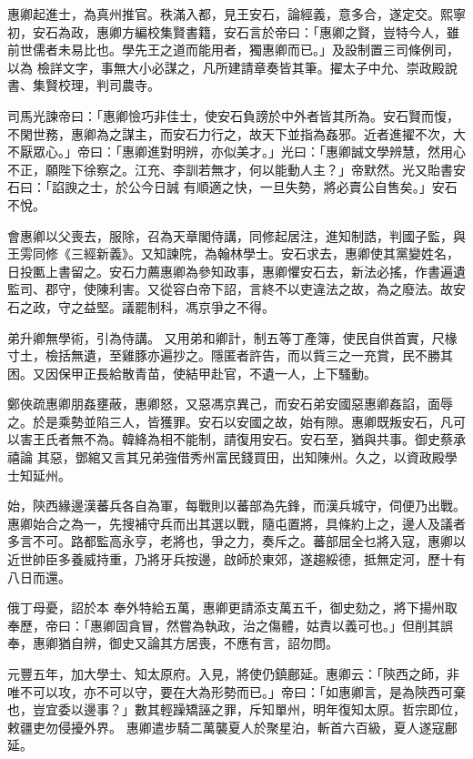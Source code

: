 \begin{pinyinscope}
 惠卿起進士，為真州推官。秩滿入都，見王安石，論經義，意多合，遂定交。熙寧初，安石為政，惠卿方編校集賢書籍，安石言於帝曰：「惠卿之賢，豈特今人，雖前世儒者未易比也。學先王之道而能用者，獨惠卿而已。」及設制置三司條例司，以為
 檢詳文字，事無大小必謀之，凡所建請章奏皆其筆。擢太子中允、崇政殿說書、集賢校理，判司農寺。



 司馬光諫帝曰：「惠卿憸巧非佳士，使安石負謗於中外者皆其所為。安石賢而愎，不閑世務，惠卿為之謀主，而安石力行之，故天下並指為姦邪。近者進擢不次，大不厭眾心。」帝曰：「惠卿進對明辨，亦似美才。」光曰：「惠卿誠文學辨慧，然用心不正，願陛下徐察之。江充、李訓若無才，何以能動人主？」帝默然。光又貽書安石曰：「諂諛之士，於公今日誠
 有順適之快，一旦失勢，將必賣公自售矣。」安石不悅。



 會惠卿以父喪去，服除，召為天章閣侍講，同修起居注，進知制誥，判國子監，與王雱同修《三經新義》。又知諫院，為翰林學士。安石求去，惠卿使其黨變姓名，日投匭上書留之。安石力薦惠卿為參知政事，惠卿懼安石去，新法必搖，作書遍遺監司、郡守，使陳利害。又從容白帝下詔，言終不以吏違法之故，為之廢法。故安石之政，守之益堅。議罷制科，馮京爭之不得。



 弟升卿無學術，引為侍講。
 又用弟和卿計，制五等丁產簿，使民自供首實，尺椽寸土，檢括無遺，至雞豚亦遍抄之。隱匿者許告，而以貲三之一充賞，民不勝其困。又因保甲正長給散青苗，使結甲赴官，不遺一人，上下騷動。



 鄭俠疏惠卿朋姦壅蔽，惠卿怒，又惡馮京異己，而安石弟安國惡惠卿姦諂，面辱之。於是乘勢並陷三人，皆獲罪。安石以安國之故，始有隙。惠卿既叛安石，凡可以害王氏者無不為。韓絳為相不能制，請復用安石。安石至，猶與共事。御史蔡承禧論
 其惡，鄧綰又言其兄弟強借秀州富民錢買田，出知陳州。久之，以資政殿學士知延州。



 始，陝西緣邊漢蕃兵各自為軍，每戰則以蕃部為先鋒，而漢兵城守，伺便乃出戰。惠卿始合之為一，先搜補守兵而出其選以戰，隨屯置將，具條約上之，邊人及議者多言不可。路都監高永亨，老將也，爭之力，奏斥之。蕃部屈全乜將入寇，惠卿以近世帥臣多養威持重，乃將牙兵按邊，啟師於東郊，遂趨綏德，抵無定河，歷十有八日而還。



 俄丁母憂，詔於本
 奉外特給五萬，惠卿更請添支萬五千，御史劾之，將下揚州取奉歷，帝曰：「惠卿固貪冒，然嘗為執政，治之傷體，姑責以義可也。」但削其誤奉，惠卿猶自辨，御史又論其方居喪，不應有言，詔勿問。



 元豐五年，加大學士、知太原府。入見，將使仍鎮鄜延。惠卿云：「陝西之師，非唯不可以攻，亦不可以守，要在大為形勢而已。」帝曰：「如惠卿言，是為陝西可棄也，豈宜委以邊事？」數其輕躁矯誣之罪，斥知單州，明年復知太原。哲宗即位，敕疆吏勿侵擾外界。
 惠卿遣步騎二萬襲夏人於聚星泊，斬首六百級，夏人遂寇鄜延。




\end{pinyinscope}
